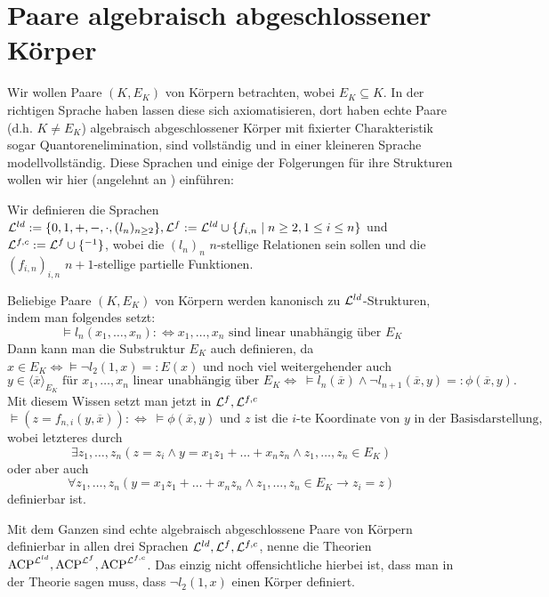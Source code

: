     \section{Paare algebraisch abgeschlossener Körper}
    Wir wollen Paare $(K,E_K)$ von Körpern betrachten, wobei $E_K\subseteq K$. In der richtigen Sprache haben lassen diese sich axiomatisieren, dort haben echte Paare (d.h. $K\neq E_K$) algebraisch abgeschlossener Körper mit fixierter Charakteristik sogar Quantorenelimination, sind vollständig und in einer kleineren Sprache modellvollständig. Diese Sprachen und einige der Folgerungen für ihre Strukturen wollen wir hier (angelehnt an \cite{Delon}) einführen:
    
    \begin{definition}
    	Wir definieren die Sprachen $\mathcal{L}^{ld}:=\{0,1,+,-,\cdot,(l_n)_{n\geq2}\},\mathcal{L}^f:=\mathcal{L}^{ld}\cup\{f_{i,n}\mid n\geq2,1\leq i\leq n\}$ und $\mathcal{L}^{f,c}:=\mathcal{L}^f\cup\{^{-1}\}$, wobei die $(l_n)_n$ $n$-stellige Relationen sein sollen und die $(f_{i,n})_{i,n}$ $n+1$-stellige partielle Funktionen.
    \end{definition}
    
    \begin{lemma}\label{Symbolik}
    	Beliebige Paare $(K,E_K)$ von Körpern werden kanonisch zu $\mathcal{L}^{ld}$-Strukturen, indem man folgendes setzt:
    	$$\models l_n(x_1,\dots,x_n):\Leftrightarrow x_1,\dots,x_n\text{ sind linear unabhängig über }E_K$$
    	Dann kann man die Substruktur $E_K$ auch definieren, da $x\in E_K\Leftrightarrow \models\neg l_2(1,x)=:E(x)$ und noch viel weitergehender auch $$y\in\langle\overline{x}\rangle_{E_K}\text{ für } x_1,\dots,x_n\text{ linear unabhängig über }E_K\Leftrightarrow\ \models l_n(\overline{x})\land\neg l_{n+1}(\overline{x},y)=:\phi(\overline{x},y).$$
    	Mit diesem Wissen setzt man jetzt in $\mathcal{L}^f,\mathcal{L}^{f,c}$
    	$$\models (z=f_{n,i}(y,\overline{x})):\Leftrightarrow\ \models\phi(\overline{x},y)\text{ und }z\text{ ist die }i\text{-te Koordinate von }y\text{ in der Basisdarstellung},$$
    	wobei letzteres durch $$\exists z_1,\dots,z_n(z=z_i\land y=x_1z_1+\dots+x_nz_n\land z_1,\dots,z_n\in E_K)$$ oder aber auch $$\forall z_1,\dots,z_n(y=x_1z_1+\dots+x_nz_n\land z_1,\dots,z_n\in E_K\rightarrow z_i=z)$$ definierbar ist.
    \end{lemma}
    
    \begin{lemma}
    	Mit dem Ganzen sind echte algebraisch abgeschlossene Paare von Körpern definierbar in allen drei Sprachen $\mathcal{L}^{ld},\mathcal{L}^f,\mathcal{L}^{f,c}$, nenne die Theorien $\operatorname{ACP}^{\mathcal{L}^{ld}},\operatorname{ACP}^{\mathcal{L}^f},\operatorname{ACP}^{\mathcal{L}^{f,c}}$. Das einzig nicht offensichtliche hierbei ist, dass man in der Theorie sagen muss, dass $\neg l_2(1,x)$ einen Körper definiert.
    \end{lemma}
    
